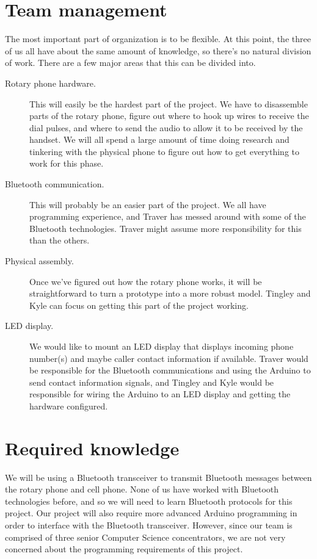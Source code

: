 \documentclass[11pt]{article}
\begin{document}
    \section{Team management}
        The most important part of organization is to be flexible. At this point, the three of us all have about the same amount of knowledge, so there's no natural division of work. There are a few major areas that this can be divided into.
        \begin{description}
            \item[Rotary phone hardware.]
                This will easily be the hardest part of the project. We have to disassemble parts of the rotary phone, figure out where to hook up wires to receive the dial pulses, and where to send the audio to allow it to be received by the handset. We will all spend a large amount of time doing research and tinkering with the physical phone to figure out how to get everything to work for this phase.
            \item[Bluetooth communication.]
                This will probably be an easier part of the project. We all have programming experience, and Traver has messed around with some of the Bluetooth technologies. Traver might assume more responsibility for this than the others.
            \item[Physical assembly.]
                Once we've figured out how the rotary phone works, it will be straightforward to turn a prototype into a more robust model. Tingley and Kyle can focus on getting this part of the project working.
            \item[LED display.]
                We would like to mount an LED display that displays incoming phone number(s) and maybe caller contact information if available. Traver would be responsible for the Bluetooth communications and using the Arduino to send contact information signals, and Tingley and Kyle would be responsible for wiring the Arduino to an LED display and getting the hardware configured.
        \end{description}

    \section{Required knowledge}
        We will be using a Bluetooth transceiver to transmit Bluetooth messages between the rotary phone and cell phone. None of us have worked with Bluetooth technologies before, and so we will need to learn Bluetooth protocols for this project. Our project will also require more advanced Arduino programming in order to interface with the Bluetooth transceiver. However, since our team is comprised of three senior Computer Science concentrators, we are not very concerned about the programming requirements of this project.
\end{document}
